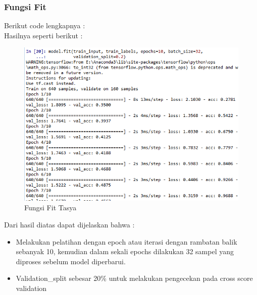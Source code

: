 \begin{enumerate}
\begin{itemize}
\subsubsection{Fungsi Fit}
Berikut code lengkapnya :\\

Hasilnya seperti berikut :\\
\begin{figure}[ht]
\centering
\includegraphics[scale=0.5]{figures/chapter6tasya19.png}
\caption{Fungsi Fit Tasya}
\label{Praktek}
\end{figure}
Dari hasil diatas dapat dijelaskan bahwa :\\
\begin{itemize}
\item Melakukan pelatihan dengan epoch atau iterasi dengan rambatan balik sebanyak 10, kemudian dalam sekali epochs dilakukan 32  sampel yang diproses sebelum model diperbarui.
\item Validation\_split sebesar 20\% untuk melakukan pengecekan pada cross score validation
\end{itemize}


\end{itemize}
\end{enumerate}
